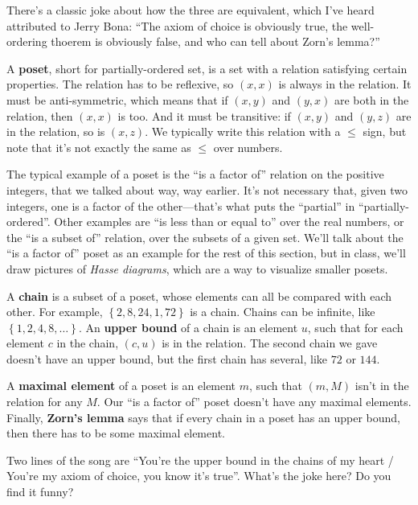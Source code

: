 \documentclass[11pt,paper=letter]{scrartcl}
\renewcommand{\bluebf}[1]{{\bfseries \color{Blue} #1}}
\begin{document}
\begin{remboxed}
  There's a classic joke about how the three are equivalent, which I've heard attributed to Jerry Bona: ``The axiom of choice is obviously true, the well-ordering thoerem is obviously false, and who can tell about Zorn's lemma?''
\end{remboxed}

A \textbf{poset}, short for partially-ordered set, is a set with a relation satisfying certain properties. The relation has to be reflexive, so $(x, x)$ is always in the relation. It must be anti-symmetric, which means that if $(x, y)$ and $(y, x)$ are both in the relation, then $(x, x)$ is too. And it must be transitive: if $(x, y)$ and $(y, z)$ are in the relation, so is $(x, z)$. We typically write this relation with a $\le$ sign, but note that it's not exactly the same as $\le$ over numbers.

The typical example of a poset is the ``is a factor of'' relation on the positive integers, that we talked about way, way earlier. It's not necessary that, given two integers, one is a factor of the other---that's what puts the ``partial'' in ``partially-ordered''. Other examples are ``is less than or equal to'' over the real numbers, or the ``is a subset of'' relation, over the subsets of a given set. We'll talk about the ``is a factor of'' poset as an example for the rest of this section, but in class, we'll draw pictures of \textit{Hasse diagrams}, which are a way to visualize smaller posets.

A \bluebf{chain} is a subset of a poset, whose elements can all be compared with each other. For example, $ \left\{ 2, 8, 24, 1, 72 \right\} $ is a chain. Chains can be infinite, like $ \left\{ 1, 2, 4, 8, \dots \right\} $. An \bluebf{upper bound} of a chain is an element $u$, such that for each element $c$ in the chain, $(c, u)$ is in the relation. The second chain we gave doesn't have an upper bound, but the first chain has several, like $72$ or $144$.

A \textbf{maximal element} of a poset is an element $m$, such that $(m, M)$ isn't in the relation for any $M$. Our ``is a factor of'' poset doesn't have any maximal elements. Finally, \textbf{Zorn's lemma} says that if every chain in a poset has an upper bound, then there has to be some maximal element.

\begin{exrboxed}
  Two lines of the song are ``You're the upper bound in the chains of my heart / You're my axiom of choice, you know it's true''. What's the joke here? Do you find it funny?
\end{exrboxed}
\end{document}
